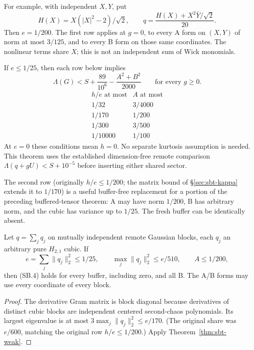 For example, with independent \(X,Y\), put
\[
 H(X)=X(|X|^2-2)/\sqrt2,\qquad
 q=\frac{H(X)+X^2\bar Y/\sqrt2}{20}.
\]
Then \(e=1/200\). The first row applies at \(g=0\), to every A form on
\((X,Y)\) of norm at most \(3/125\), and to every B form on those
same coordinates. The nonlinear terms share \(X\); this is not an
independent sum of Wick monomials.

\begin{theorem}
\label{thm:sbt-weak}
If \(e\le1/25\), then each row below implies
\[
 \boxed{\quad
 \Lambda(G)<S+\frac{89}{10^6}-\frac{A^2+B^2}{2000}
 \qquad\text{for every }g\ge0.
 \quad} \tag{SB.4}
\]
\[
\begin{array}{c|c}
 h/e\text{ at most}&A\text{ at most}\\ \hline
1/32&3/4000\\
1/170&1/200\\
1/300&3/500\\
1/10000&1/100
\end{array}
\tag{SB.5}
\]
At \(e=0\) these conditions mean \(h=0\).
No separate kurtosis assumption is needed.
This theorem uses the established dimension-free remote comparison
\(\Lambda(q+gU)<S+10^{-5}\) before inserting either shared sector.
\end{theorem}

The second row (originally \(h/e\le1/200\); the matrix bound of
\S\ref{sec:sbt-kappa} extends it to \(1/170\)) is a useful buffer-free replacement for a portion of
the preceding buffered-tensor theorem: A may have norm \(1/200\),
B has arbitrary norm, and the cubic has variance up to \(1/25\).
The fresh buffer can be identically absent.

\begin{corollary}
\label{cor:sbt-blocks}
Let \(q=\sum_jq_j\) on mutually independent remote Gaussian blocks,
each \(q_j\) an arbitrary pure \(H_{2,1}\) cubic. If
\[
 e=\sum_j\|q_j\|_2^2\le1/25,\qquad
 \max_j\|q_j\|_2^2\le e/510,\qquad A\le1/200,
\]
then (SB.4) holds for every buffer, including zero, and all B.
The A/B forms may use every coordinate of every block.
\end{corollary}
\begin{proof}
The derivative Gram matrix is block diagonal because derivatives of
distinct cubic blocks are independent centered second-chaos polynomials.
Its largest eigenvalue is at most \(3\max_j\|q_j\|_2^2\le e/170\).
(The original share was \(e/600\), matching the original row \(h/e\le1/200\).)
Apply Theorem~\ref{thm:sbt-weak}.
\end{proof}

